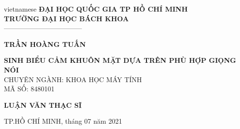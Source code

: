 \begin{titlepage}
\begin{center}

\vspace*{3\bigskipamount}

\begin{otherlanguage*}{vietnamese}
\makeatletter
\fontsize{12}{12}\textbf{ĐẠI HỌC QUỐC GIA TP HỒ CHÍ MINH}\\
\fontsize{14}{14}\textbf{TRƯỜNG ĐẠI HỌC BÁCH KHOA}\\
\fontsize{14}{14} -----------------------------------
\makeatother
\vspace{3cm}

{\makeatletter
\fontsize{16}{16}\textbf{TRẦN HOÀNG TUẤN}\\
\makeatother}
\vspace{3cm}

{\makeatletter
\fontsize{16}{16}\textbf{SINH BIỂU CẢM KHUÔN MẶT DỰA TRÊN PHÙ HỢP GIỌNG NÓI}\\
\vspace{1cm}
\fontsize{12}{12} CHUYÊN NGÀNH: KHOA HỌC MÁY TÍNH\\
\fontsize{12}{12} MÃ SỐ: 8480101\\
\makeatother}

\vspace{1.2cm}
{\makeatletter
\fontsize{18}{18}\textbf{LUẬN VĂN THẠC SĨ}\\
\makeatother}


\vspace{8cm}
{\makeatletter
\fontsize{12}{12} TP.HỒ CHÍ MINH, tháng 07 năm 2021\\
\makeatother}

\end{otherlanguage*}

\end{center}
\end{titlepage}
